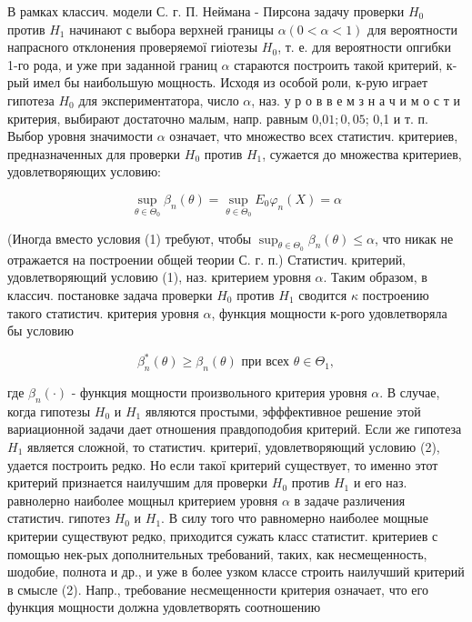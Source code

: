 \documentclass[10pt]{article}
\begin{document}
В рамках классич. модели С. г. П. Неймана - Пирсона задачу проверки $H_{0}$ против $H_{1}$ начинают с выбора верхней границы $\alpha(0<\alpha<1)$ для вероятности напрасного отклонения проверяемої гиіотезы $H_{0}$, т. е. для вероятности опгибки 1-го рода, и уже при заданной границ $\alpha$ стараются построить такой критерий, к-рый имел бы наибольшую мощность. Исходя из особой роли, к-рую играет гипотеза $H_{0}$ для экспериментатора, число $\alpha$, наз. у р о в в е м з н а ч и м о с т и критерия, выбирают достаточно малым, напр. равным 0,$01 ; 0,05$; 0,1 и т. п. Выбор уровня значимости $\alpha$ означает, что множество всех статистич. критериев, предназначенных для проверки $H_{0}$ против $H_{1}$, сужается до множества критериев, удовлетворяющих условию:



\[

\sup _{\theta \in \Theta_{0}} \beta_{n}(\theta)=\sup _{\theta \in \Theta_{0}} E_{0} \varphi_{n}(X)=\alpha

\]



(Иногда вместо условия (1) требуют, чтобы $\sup _{\theta \in \Theta_{0}} \beta_{n}(\theta) \leqslant \alpha$, что никак не отражается на построении общей теории С. г. п.) Статистич. критерий, удовлетворяющий условию (1), наз. критерием уровня $\alpha$. Таким образом, в классич. постановке задача проверки $H_{0}$ против $H_{1}$ сводится $\kappa$ построению такого статистич. критерия уровня $\alpha$, функция мощности к-рого удовлетворяла бы условию



\[

\beta_{n}^{*}(\theta) \geqslant \beta_{n}(\theta) \text { при всех } \theta \in \Theta_{1},

\]



где $\beta_{n}(\cdot)$ - функция мощности произвольного критерия уровня $\alpha$. В случае, когда гипотезы $H_{0}$ и $H_{1}$ являются простыми, эфффективное решение этой вариационной задачи дает отношения правдоподобия критерий. Если же гипотеза $H_{1}$ является сложной, то статистич. критериї, удовлетворяющий условию (2), удается построить редко. Но если такої критерий существует, то именно этот критерий признается наилучшим для проверки $H_{0}$ против $H_{1}$ и его наз. равнолерно наиболее мощныл критерием уровня $\alpha$ в задаче различения статистич. гипотез $H_{0}$ и $H_{1}$. В силу того что равномерно наиболее мощные критерии существуют редко, приходится сужать класс статистит. критериев с помощью нек-рых дополнительных требований, таких, как несмещенность, шодобие, полнота и др., и уже в более узком классе строить наилучший критерий в смысле (2). Напр., требование несмещенности критерия означает, что его функция мощности должна удовлетворять соотношению
\end{document}
